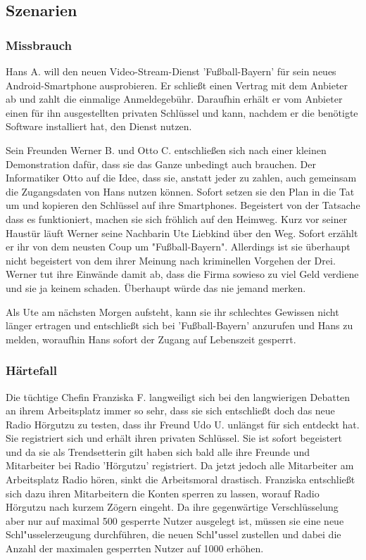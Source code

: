 \documentclass[a4paper,10pt]{scrartcl}
\begin{document}
\subsection{Szenarien}
\subsubsection{Missbrauch}
Hans A. will den neuen Video-Stream-Dienst 'Fußball-Bayern' für sein neues Android-Smartphone ausprobieren. Er schließt einen Vertrag mit dem Anbieter ab und zahlt die einmalige Anmeldegebühr. Daraufhin erhält er vom Anbieter einen für ihn ausgestellten privaten Schlüssel und kann, nachdem er die benötigte Software installiert hat, den Dienst nutzen.

Sein Freunden Werner B. und Otto C. entschließen sich nach einer kleinen Demonstration dafür, dass sie das Ganze unbedingt auch brauchen. Der Informatiker Otto auf die Idee, dass sie, anstatt jeder zu zahlen, auch gemeinsam die Zugangsdaten von Hans nutzen können. Sofort setzen sie den Plan in die Tat um und kopieren den Schlüssel auf ihre Smartphones. Begeistert von der Tatsache dass es funktioniert, machen sie sich fröhlich auf den Heimweg. Kurz vor seiner Haustür läuft Werner seine Nachbarin Ute Liebkind über den Weg. Sofort erzählt er ihr von dem neusten Coup um "Fußball-Bayern". Allerdings ist sie überhaupt nicht begeistert von dem ihrer Meinung nach kriminellen Vorgehen der Drei. Werner tut ihre Einwände damit ab, dass die Firma sowieso zu viel Geld verdiene und sie ja keinem schaden. Überhaupt würde das nie jemand merken.

Als Ute am nächsten Morgen aufsteht, kann sie ihr schlechtes Gewissen nicht länger ertragen und entschließt sich bei 'Fußball-Bayern' anzurufen und Hans zu melden, woraufhin Hans sofort der Zugang auf Lebenszeit gesperrt.

\subsubsection{Härtefall}
Die tüchtige Chefin Franziska F. langweiligt sich bei den langwierigen
Debatten an ihrem Arbeitsplatz immer so sehr, dass sie sich entschließt doch
das neue Radio Hörgutzu zu testen, dass ihr Freund Udo U. unlängst für sich entdeckt hat.
Sie registriert sich und erhält ihren privaten Schlüssel.
Sie ist sofort begeistert und da sie als Trendsetterin gilt haben sich bald alle ihre Freunde
und Mitarbeiter bei Radio 'Hörgutzu' registriert. Da jetzt jedoch alle Mitarbeiter am Arbeitsplatz
Radio hören, sinkt die Arbeitsmoral drastisch. Franziska entschließt sich dazu ihren Mitarbeitern
die Konten sperren zu lassen, worauf Radio Hörgutzu nach kurzem Zögern eingeht. Da ihre
gegenwärtige Verschlüsselung aber nur auf maximal 500 gesperrte
Nutzer ausgelegt ist, müssen sie eine neue Schl"usselerzeugung durchführen, die neuen Schl"ussel
zustellen und dabei die Anzahl der maximalen gesperrten Nutzer auf 1000 erhöhen.
\end{document}
